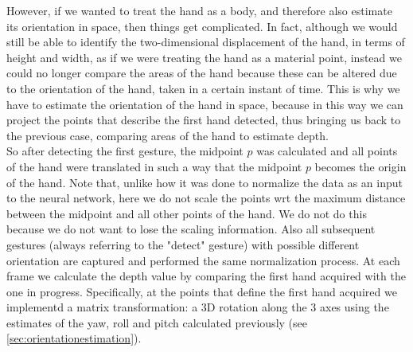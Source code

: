 \noindent However, if we wanted to treat the hand as a body, and therefore also estimate its orientation in space, then things get complicated. In fact, although we would still be able to identify the two-dimensional displacement of the hand, in terms of height and width, as if we were treating the hand as a material point, instead we could no longer compare the areas of the hand because these can be altered due to the orientation of the hand, taken in a certain instant of time. This is why we have to estimate the orientation of the hand in space, because in this way we can project the points that describe the first hand detected, thus bringing us back to the previous case, comparing areas of the hand to estimate depth. \\



\noindent So after detecting the first gesture, the midpoint $p$ was calculated and all points of the hand were translated in such a way that the midpoint $p$ becomes the origin of the hand. Note that, unlike how it was done to normalize the data as an input to the neural network, here we do not scale the points \gls{wrt} the maximum distance between the midpoint and all other points of the hand. We do not do this because we do not want to lose the scaling information. Also all subsequent gestures (always referring to the "detect" gesture) with possible different orientation are captured and performed the same normalization process. At each frame we calculate the depth value by comparing the first hand acquired with the one in progress. Specifically, at the points that define the first hand acquired we implementd a matrix transformation: a 3D rotation along the 3 axes using the estimates of the yaw, roll and pitch calculated previously (see \ref{sec:orientationestimation}).

